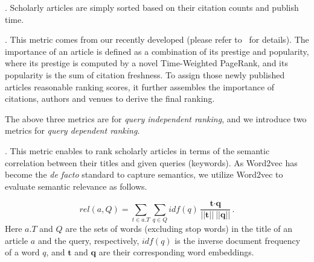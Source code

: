 




. Scholarly articles are simply sorted based on their citation counts and publish time. %


. This metric comes from our recently developed \sarank (please refer to~\cite{ma2018query} for details). The importance of an article is defined as a combination of its prestige and popularity, where its prestige is computed by a novel Time-Weighted PageRank, and its popularity is the sum of citation freshness. To assign those newly published articles reasonable ranking scores, it further assembles the importance of citations, authors and venues to derive the final ranking. %

The above three metrics are for {\em query independent ranking}, and we introduce two metrics for {\em query dependent ranking}.

. This metric enables to rank scholarly articles in terms of the semantic correlation between their titles and given queries (keywords). As Word2vec \cite{corrado2013efficient} has become the {\em de facto} standard to capture semantics, we utilize Word2vec to evaluate semantic relevance as follows.

\begin{equation}
\label{eq:relscore}
rel(a, Q) = \sum_{t \in a.T} \sum_{q \in Q} idf(q) \frac {\textbf{t} \cdot \textbf{q}} {|| \textbf{t} ||\ ||\textbf{q}||}.
\end{equation}
Here $a.T$ and $Q$ are the sets of words (excluding stop words) in the title of an article $a$ and the query, respectively, $idf(q)$ is the inverse document frequency of a word $q$, and $\textbf{t}$ and $\textbf{q}$ are their corresponding word embeddings. 



